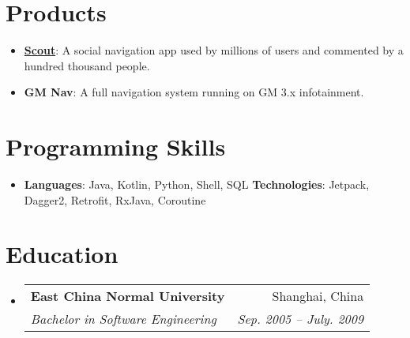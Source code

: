 \documentclass[letterpaper,11pt]{article}
\makeatletter
\newcommand{\resumeItem}[2]{
  \item\small{
    \textbf{#1}{: #2 \vspace{-2pt}}
  }
}
\newcommand{\resumeSubheading}[4]{
  \vspace{-1pt}\item
    \begin{tabular*}{0.97\textwidth}{l@{\extracolsep{\fill}}r}
      \textbf{#1} & #2 \\
      \textit{\small#3} & \textit{\small #4} \\
    \end{tabular*}\vspace{-5pt}
}
\newcommand{\resumeSubItem}[2]{\resumeItem{#1}{#2}\vspace{-4pt}}
\newcommand{\resumeSubHeadingListStart}{\begin{itemize}[leftmargin=*]}
\newcommand{\resumeSubHeadingListEnd}{\end{itemize}}
\makeatother
\begin{document}
\section{Products}
  \resumeSubHeadingListStart
    \resumeSubItem{\href{https://play.google.com/store/apps/details?id=com.telenav.app.android.scout_us}{Scout}}
      {A social navigation app used by millions of users and commented by a hundred thousand people.}
    \resumeSubItem{GM Nav}
      {A full navigation system running on GM 3.x infotainment.}
  \resumeSubHeadingListEnd

%
\section{Programming Skills}
 \resumeSubHeadingListStart
   \item{
     \textbf{Languages}{: Java, Kotlin, Python, Shell, SQL}
     \hfill
     \textbf{Technologies}{: Jetpack, Dagger2, Retrofit, RxJava, Coroutine}
   }
 \resumeSubHeadingListEnd


\section{Education}
  \resumeSubHeadingListStart
    \resumeSubheading
      {East China Normal University}{Shanghai, China}
      {Bachelor in Software Engineering}{Sep. 2005 -- July. 2009}
  \resumeSubHeadingListEnd
\end{document}
